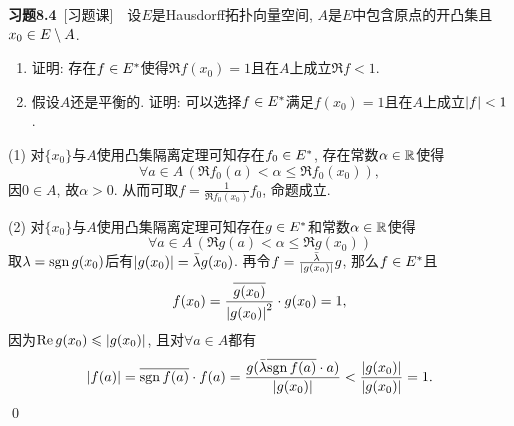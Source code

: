     \textbf{习题8.4}\ [习题课]\ \ 设$ E $是Hausdorff拓扑向量空间, $ A $是$ E $中包含原点的开凸集且$ x_0\in E\setminus A $.
    \begin{enumerate}[(1)]
    \item 证明: 存在$ f\in E^{*} $使得$ \Re f(x_0)=1 $且在$ A $上成立$ \Re f<1 $.
    \item 假设$ A $还是平衡的. 证明: 可以选择$ f\in E^{*} $满足$ f(x_0)=1 $且在$ A $上成立$ \left| f \right| <1 $.
    \end{enumerate}
    \begin{Proof}
    (1) 对$ \{x_0\} $与$ A $使用凸集隔离定理可知存在$ f_0\in E^{*} $, 存在常数$ \alpha\in\mathbb{R} $使得
    \[
    \forall a\in A\,(\Re f_0(a)<\alpha\leqslant\Re f_0(x_0)),
    \]
    因$ 0\in A $, 故$ \alpha>0 $. 从而可取$ f=\frac{1}{\Re f_0(x_0)}f_0 $, 命题成立.
    
    (2) 对$ \{ x_0 \} $与$ A $使用凸集隔离定理可知存在$ g\in E^{*} $和常数$ \alpha\in\mathbb{R} $使得
    \[
    \forall a\in A\,(\Re g(a)<\alpha\leqslant\Re g(x_0))
    \]
    取$ \lambda=\mathrm{sgn}\, g(x_0) $后有$ \left| g(x_0) \right| =\bar{\lambda}g(x_0) $. 再令$ f=\frac{\bar{\lambda}}{\left| g(x_0) \right| }g $, 那么$ f\in E^{*} $且
    \[
    f(x_0)=\frac{\overline{g(x_0)}}{\left| g(x_0) \right| ^2}\cdot g(x_0)=1,
    \]
    因为$ \mathrm{Re\,} g(x_0)\leqslant\left| g(x_0) \right|  $, 且对$ \forall a\in A $都有
    \[
    \left| f(a) \right| =\overline{\mathrm{sgn}\, f(a)}\cdot f(a)=\frac{g(\bar{\lambda}\overline{\mathrm{sgn}\, f(a)}\cdot a)}{\left| g(x_0) \right| }<\frac{\left| g(x_0) \right| }{\left| g(x_0) \right| }=1.
    \]
    \qed
    \end{Proof}
    
